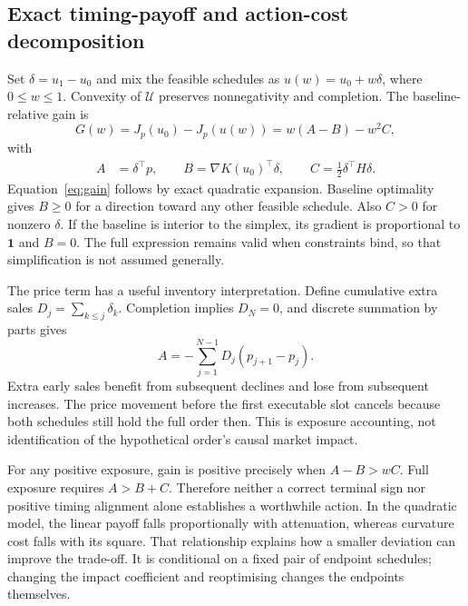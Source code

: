 \subsection{Exact timing-payoff and action-cost decomposition}
Set $\delta=u_1-u_0$ and mix the feasible schedules as $u(w)=u_0+w\delta$, where $0\leq w\leq1$. Convexity of $\mathcal U$ preserves nonnegativity and completion. The baseline-relative gain is
\begin{equation}
 G(w)=J_p(u_0)-J_p(u(w))=w(A-B)-w^2C,
 \label{eq:gain}
\end{equation}
with
\begin{align}
 A&=\delta^\top p,\qquad
 B=\nabla K(u_0)^\top\delta,\qquad
 C=\tfrac12\delta^\top H\delta.\label{eq:abc}
\end{align}
Equation~\eqref{eq:gain} follows by exact quadratic expansion. Baseline optimality gives $B\geq0$ for a direction toward any other feasible schedule. Also $C>0$ for nonzero $\delta$. If the baseline is interior to the simplex, its gradient is proportional to $\mathbf1$ and $B=0$. The full expression remains valid when constraints bind, so that simplification is not assumed generally.

The price term has a useful inventory interpretation. Define cumulative extra sales $D_j=\sum_{k\leq j}\delta_k$. Completion implies $D_N=0$, and discrete summation by parts gives
\begin{equation}
 A=-\sum_{j=1}^{N-1}D_j(p_{j+1}-p_j).\label{eq:inventory}
\end{equation}
Extra early sales benefit from subsequent declines and lose from subsequent increases. The price movement before the first executable slot cancels because both schedules still hold the full order then. This is exposure accounting, not identification of the hypothetical order's causal market impact.

For any positive exposure, gain is positive precisely when $A-B>wC$. Full exposure requires $A>B+C$. Therefore neither a correct terminal sign nor positive timing alignment alone establishes a worthwhile action. In the quadratic model, the linear payoff falls proportionally with attenuation, whereas curvature cost falls with its square. That relationship explains how a smaller deviation can improve the trade-off. It is conditional on a fixed pair of endpoint schedules; changing the impact coefficient and reoptimising changes the endpoints themselves.

